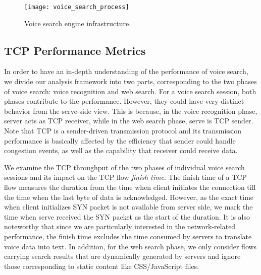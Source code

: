 

\begin{figure}[th]
	\centering
	\texttt{[image: voice\_search\_process]}
	\caption{Voice search engine infrastructure.}
	\label{fig:voice_search}
\end{figure}

\subsection{TCP Performance Metrics}

In order to have an in-depth understanding of the performance of voice search, we divide our analysis framework into two parts, corresponding to the two phases of voice search: voice recognition and web search. For a voice search session, both phases contribute to the performance. However, they could have very distinct behavior from the serve-side view. This is because, in the voice recognition phase, server acts as TCP receiver, while in the web search phase, serve is TCP sender. Note that TCP is a sender-driven transmission protocol and its transmission performance is basically affected by the efficiency that sender could handle congestion events, as well as the capability that receiver could receive data.

We examine the TCP throughput of the two phases of individual voice search sessions and its impact on the TCP flow \emph{finish time}. The finish time of a TCP flow measures the duration from the time when client initiates the connection till the time when the last byte of data is acknowledged. However, as the exact time when client initializes SYN packet is not available from server side, we mark the time when serve received the SYN packet as the start of the duration. It is also noteworthy that since we are particularly interested in the network-related performance, the finish time excludes the time consumed by servers to translate voice data into text. In addition, for the web search phase, we only consider flows carrying search results that are dynamically generated by servers and ignore those corresponding to static content like CSS/JavaScript files.  

